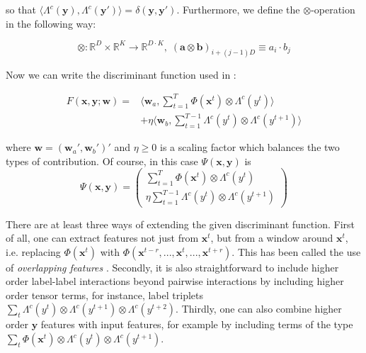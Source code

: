 so that $\langle \Lambda^c(\mathbf{y}),\Lambda^c(\mathbf{y}')\rangle =\delta(\mathbf{y},\mathbf{y}')$. Furthermore, we define the $\otimes$-operation in the following way:

\begin{equation}
\otimes:\mathbb{R}^D \times \mathbb{R}^K \rightarrow \mathbb{R}^{D\cdot K},\; (\mathbf{a}\otimes\mathbf{b})_{i+(j-1)D} \equiv a_i \cdot b_j
\end{equation}

Now we can write the discriminant function used in \cite{tsochantaridis2005large}:

\begin{eqnarray}
F(\mathbf{x},\mathbf{y};\mathbf{w}) = & \langle \mathbf{w}_a,\sum_{t=1}^T \Phi(\mathbf{x}^t) \otimes \Lambda^c(y^t) \rangle \nonumber \\
 & +\eta \langle \mathbf{w}_b,\sum_{t=1}^{T-1}  \Lambda^c(y^{t}) \otimes \Lambda^c(y^{t+1}) \rangle
\end{eqnarray}

where $\mathbf{w} = (\mathbf{w}_a',\mathbf{w}_b')'$ and $\eta \geq 0$ is a scaling factor which balances the two types of contribution. Of course, in this case $\Psi(\mathbf{x},\mathbf{y})$ is
\begin{equation}
\Psi(\mathbf{x},\mathbf{y}) = \left( \begin{array}{cc} \sum_{t=1}^T \Phi(\mathbf{x}^t) \otimes \Lambda^c(y^t) \\ \eta\sum_{t=1}^{T-1}  \Lambda^c(y^{t}) \otimes \Lambda^c(y^{t+1}) \end{array} \right)
\end{equation}

There are at least three ways of extending the given discriminant function. First of all, one can extract features not just from $\mathbf{x}^t$, but from a window around $\mathbf{x}^t$, i.e. replacing $\Phi(\mathbf{x}^t)$ with $\Phi(\mathbf{x}^{t-r},...,\mathbf{x}^t,...,\mathbf{x}^{t+r})$. This has been called the use of \textit{overlapping features} \cite{altun2003hidden}. Secondly, it is also straightforward to include higher order label-label interactions beyond pairwise interactions by including higher order tensor terms, for instance, label triplets $\sum_{t}  \Lambda^c(y^{t}) \otimes \Lambda^c(y^{t+1}) \otimes \Lambda^c(y^{t+2})$. Thirdly, one can also combine higher order $\mathbf{y}$ features with input features, for example by including terms of the type $\sum_{t} \Phi(\mathbf{x}^t) \otimes \Lambda^c(y^t) \otimes \Lambda^c(y^{t+1})$. 

